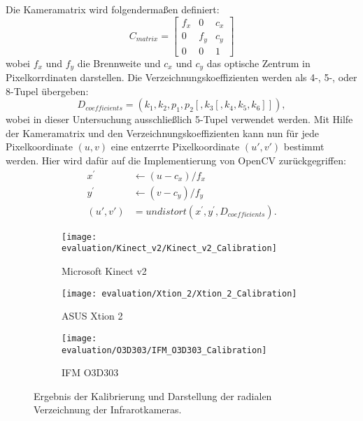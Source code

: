 \documentclass[thesis.tex]{subfiles}
\begin{document}
Die Kameramatrix wird folgendermaßen definiert:
\begin{equation}
C_{matrix} = \begin{bmatrix}
    f_x & 0 & c_x\\
    0 & f_y & c_y\\
    0 & 0   & 1
\end{bmatrix}
\end{equation}
wobei $f_x$ und $f_y$ die Brennweite und $c_x$ und $c_y$ das optische Zentrum in Pixelkorrdinaten darstellen. Die Verzeichnungskoeffizienten werden als 4-, 5-, oder 8-Tupel übergeben:
\begin{equation}
D_{coefficients} = (k_1, k_2, p_1, p_2[, k_3[, k_4, k_5, k_6]]),
\end{equation}
wobei in dieser Untersuchung ausschließlich 5-Tupel verwendet werden. Mit Hilfe der Kameramatrix und den Verzeichnungskoeffizienten kann nun für jede Pixelkoordinate $(u, v)$ eine entzerrte Pixelkoordinate $(u', v')$ bestimmt werden. Hier wird dafür auf die Implementierung von OpenCV zurückgegriffen:
%
\begin{equation}
\begin{aligned}
x^{'} &\leftarrow (u - c_x)/f_x \\
y^{'} &\leftarrow (v - c_y)/f_y \\
(u',v') &= undistort(x^{'},y^{'}, D_{coefficients}).
\end{aligned}
\end{equation}

\begin{figure}[h!]
\centering
\begin{subfigure}{.32\textwidth}
    \centering
    \texttt{[image: evaluation/Kinect\_v2/Kinect\_v2\_Calibration]}
    \caption{Microsoft Kinect v2}
    \label{fig:Kinect_v2_Calibration}
\end{subfigure}%
\begin{subfigure}{.32\textwidth}
    \centering
    \texttt{[image: evaluation/Xtion\_2/Xtion\_2\_Calibration]}
    \caption{ASUS Xtion 2}
    \label{fig:Xtion_2_Calibration}
\end{subfigure}
\begin{subfigure}{.32\textwidth}
    \centering
    \texttt{[image: evaluation/O3D303/IFM\_O3D303\_Calibration]}
    \caption{IFM O3D303}
    \label{fig:IFM_O3D303_Calibration}
\end{subfigure}
\caption{Ergebnis der Kalibrierung und Darstellung der radialen Verzeichnung der Infrarotkameras.}
\label{fig:camera_correction}
\end{figure}
\end{document}
